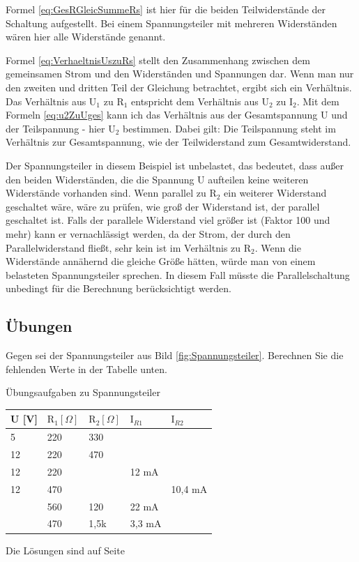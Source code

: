 Formel \ref{eq:GesRGleicSummeRs} ist hier für die beiden Teilwiderstände der Schaltung aufgestellt. Bei einem Spannungsteiler mit mehreren Widerständen wären hier alle Widerstände genannt.

Formel \ref{eq:VerhaeltnisUszuRs} stellt den Zusammenhang zwischen dem gemeinsamen Strom und den Widerständen und Spannungen dar. Wenn man nur den zweiten und dritten Teil der Gleichung betrachtet, ergibt sich ein Verhältnis. Das Verhältnis aus $\text{U}_1$ zu $\text{R}_1$ entspricht dem Verhältnis aus $\text{U}_2$ zu $\text{I}_2$. Mit dem Formeln \ref{eq:u2ZuUges} kann ich das Verhältnis aus der Gesamtspannung U und der Teilspannung - hier $\text{U}_2$ bestimmen. Dabei gilt: Die Teilspannung steht im Verhältnis zur Gesamtspannung, wie der Teilwiderstand zum Gesamtwiderstand.

Der Spannungsteiler in diesem Beispiel ist unbelastet, das bedeutet, dass außer den beiden Widerständen, die die Spannung U aufteilen keine weiteren Widerstände vorhanden sind. Wenn parallel zu $\text{R}_2$ ein weiterer Widerstand geschaltet wäre, wäre zu prüfen, wie groß der Widerstand ist, der parallel geschaltet ist. Falls der parallele Widerstand viel größer ist (Faktor 100 und mehr) kann er vernachlässigt werden, da der Strom, der durch den Parallelwiderstand fließt, sehr kein ist im Verhältnis zu $\text{R}_2$. Wenn die Widerstände annähernd die gleiche Größe hätten, würde man von einem belasteten Spannungsteiler sprechen. In diesem Fall müsste die Parallelschaltung unbedingt für die Berechnung berücksichtigt werden.

\subsection{Übungen}
\label{Aufg:Spannungsteiler}
Gegen sei der Spannungsteiler aus Bild \ref{fig:Spannungsteiler}. Berechnen Sie die fehlenden Werte in der Tabelle unten.\\

\begin{frame}{Übungsaufgaben zu Spannungsteiler}
  \begin{tabular}{l|ll|ll}
    U [V] & $\text{R}_1 [\Omega]$& $\text{R}_2 [\Omega]$& $\text{I}_{R1}$ & $\text{I}_{R2}$\\ \hline
    5  & 220 & 330 &       & \\
    12 & 220 & 470 &       & \\
    12 & 220 &     & 12 mA & \\
    12 & 470 &     &       & 10,4 mA  \\
    & 560 & 120 & 22 mA &   \\
    & 470 & 1,5k &  3,3 mA &   \\
  \end{tabular}
\end{frame}

Die Lösungen sind auf Seite \pageref{Lsg:Spannungsteiler}
